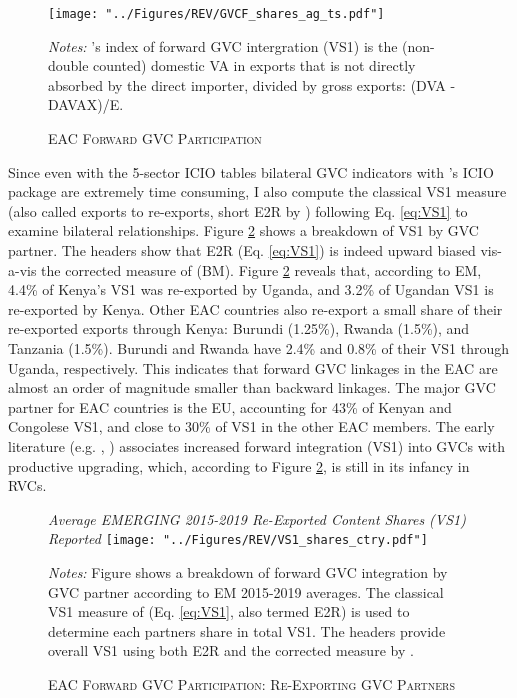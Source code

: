 \documentclass[a4paper]{article}
\begin{document}
\begin{figure}[h!] \vspace{-1mm}
\centering
\caption{\label{fig:EAC_E2R_ag_ts}\textsc{EAC Forward GVC Participation}}
\texttt{[image: "../Figures/REV/GVCF\_shares\_ag\_ts.pdf"]} \\ %
\raggedright
\scriptsize
\emph{Notes:} \citet{borin2019measuring}'s index of forward GVC intergration (VS1) is the (non-double counted) domestic VA in exports that is not directly absorbed by the direct importer, divided by gross exports: (DVA - DAVAX)/E. 
\end{figure}
\FloatBarrier

Since even with the 5-sector ICIO tables bilateral GVC indicators with \citet{belotti2020icio}'s ICIO package are extremely time consuming, I also compute the classical VS1 measure (also called exports to re-exports, short E2R by \citet{baldwin2015supply}) following Eq. \ref{eq:VS1} to examine bilateral relationships. Figure \ref{fig:EACVS1_ctry} shows a breakdown of VS1 by GVC partner. The headers show that E2R (Eq. \ref{eq:VS1}) is indeed upward biased vis-a-vis the corrected measure of \citet{borin2019measuring} (BM). Figure \ref{fig:EACVS1_ctry} reveals that, according to EM, 4.4\% of Kenya's VS1 was re-exported by Uganda, and 3.2\% of Ugandan VS1 is re-exported by Kenya. Other EAC countries also re-export a small share of their re-exported exports through Kenya: Burundi (1.25\%), Rwanda (1.5\%), and Tanzania (1.5\%). Burundi and Rwanda have 2.4\% and 0.8\% of their VS1 through Uganda, respectively. This indicates that forward GVC linkages in the EAC are almost an order of magnitude smaller than backward linkages. The major GVC partner for EAC countries is the EU, accounting for 43\% of Kenyan and Congolese VS1, and close to 30\% of VS1 in the other EAC members. The early literature (e.g. \citet{foster2015global}, \citet{Kummritz20161}) %
associates increased forward integration (VS1) into GVCs with productive upgrading, which, according to Figure \ref{fig:EACVS1_ctry}, is still in its infancy in RVCs.

\begin{figure}[h!]
\centering
\caption{\label{fig:EACVS1_ctry}\textsc{EAC Forward GVC Participation: Re-Exporting GVC Partners}}
\small{\textit{Average EMERGING 2015-2019 Re-Exported Content Shares (VS1) Reported}}
\vspace{2mm}
\texttt{[image: "../Figures/REV/VS1\_shares\_ctry.pdf"]} \\ %
\raggedright
\scriptsize
\vspace{-3mm}
\emph{Notes:} Figure shows a breakdown of forward GVC integration by GVC partner according to EM 2015-2019 averages. The classical VS1 measure of \citet{daudin2011produces} (Eq. \ref{eq:VS1}, also termed E2R) is used to determine each partners share in total VS1. The headers provide overall VS1 using both E2R and the corrected measure by \citet{borin2019measuring}. 
\end{figure}
\FloatBarrier
\end{document}
